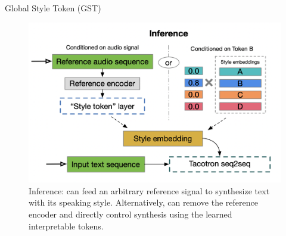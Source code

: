 \begin{frame}{Global Style Token (GST)}
    \begin{figure}
    	\centering
    	\includegraphics[width=0.8\linewidth]{figs/gst_infer.png}
    	\caption{Inference: can feed an arbitrary reference signal to synthesize text with its speaking style. Alternatively, can remove the reference encoder and directly control synthesis using the learned interpretable tokens.}
    \end{figure}
    

\end{frame}

